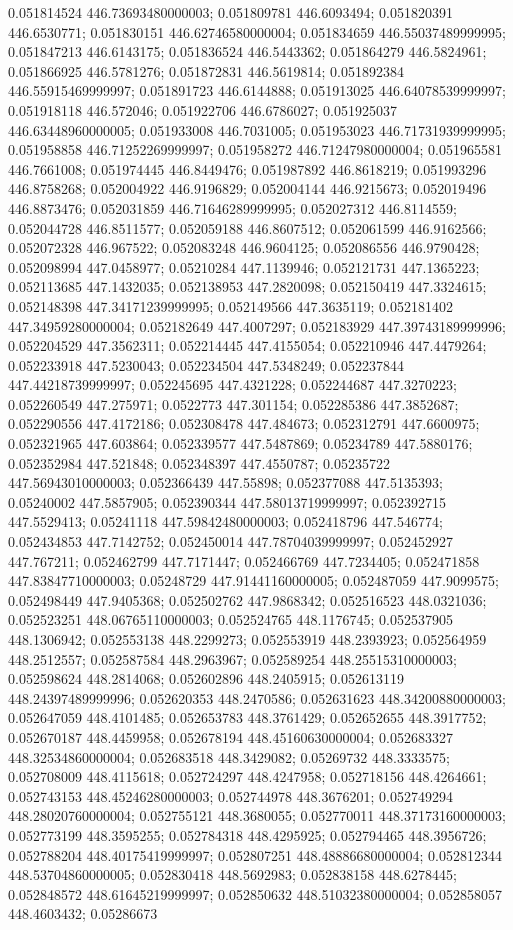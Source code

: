0.051814524 446.73693480000003; 0.051809781 446.6093494; 0.051820391 446.6530771; 0.051830151 446.62746580000004; 0.051834659 446.55037489999995; 0.051847213 446.6143175; 0.051836524 446.5443362; 0.051864279 446.5824961; 0.051866925 446.5781276; 0.051872831 446.5619814; 0.051892384 446.55915469999997; 0.051891723 446.6144888; 0.051913025 446.64078539999997; 0.051918118 446.572046; 0.051922706 446.6786027; 0.051925037 446.63448960000005; 0.051933008 446.7031005; 0.051953023 446.71731939999995; 0.051958858 446.71252269999997; 0.051958272 446.71247980000004; 0.051965581 446.7661008; 0.051974445 446.8449476; 0.051987892 446.8618219; 0.051993296 446.8758268; 0.052004922 446.9196829; 0.052004144 446.9215673; 0.052019496 446.8873476; 0.052031859 446.71646289999995; 0.052027312 446.8114559; 0.052044728 446.8511577; 0.052059188 446.8607512; 0.052061599 446.9162566; 0.052072328 446.967522; 0.052083248 446.9604125; 0.052086556 446.9790428; 0.052098994 447.0458977; 0.05210284 447.1139946; 0.052121731 447.1365223; 0.052113685 447.1432035; 0.052138953 447.2820098; 0.052150419 447.3324615; 0.052148398 447.34171239999995; 0.052149566 447.3635119; 0.052181402 447.34959280000004; 0.052182649 447.4007297; 0.052183929 447.39743189999996; 0.052204529 447.3562311; 0.052214445 447.4155054; 0.052210946 447.4479264; 0.052233918 447.5230043; 0.052234504 447.5348249; 0.052237844 447.44218739999997; 0.052245695 447.4321228; 0.052244687 447.3270223; 0.052260549 447.275971; 0.0522773 447.301154; 0.052285386 447.3852687; 0.052290556 447.4172186; 0.052308478 447.484673; 0.052312791 447.6600975; 0.052321965 447.603864; 0.052339577 447.5487869; 0.05234789 447.5880176; 0.052352984 447.521848; 0.052348397 447.4550787; 0.05235722 447.56943010000003; 0.052366439 447.55898; 0.052377088 447.5135393; 0.05240002 447.5857905; 0.052390344 447.58013719999997; 0.052392715 447.5529413; 0.05241118 447.59842480000003; 0.052418796 447.546774; 0.052434853 447.7142752; 0.052450014 447.78704039999997; 0.052452927 447.767211; 0.052462799 447.7171447; 0.052466769 447.7234405; 0.052471858 447.83847710000003; 0.05248729 447.91441160000005; 0.052487059 447.9099575; 0.052498449 447.9405368; 0.052502762 447.9868342; 0.052516523 448.0321036; 0.052523251 448.06765110000003; 0.052524765 448.1176745; 0.052537905 448.1306942; 0.052553138 448.2299273; 0.052553919 448.2393923; 0.052564959 448.2512557; 0.052587584 448.2963967; 0.052589254 448.25515310000003; 0.052598624 448.2814068; 0.052602896 448.2405915; 0.052613119 448.24397489999996; 0.052620353 448.2470586; 0.052631623 448.34200880000003; 0.052647059 448.4101485; 0.052653783 448.3761429; 0.052652655 448.3917752; 0.052670187 448.4459958; 0.052678194 448.45160630000004; 0.052683327 448.32534860000004; 0.052683518 448.3429082; 0.05269732 448.3333575; 0.052708009 448.4115618; 0.052724297 448.4247958; 0.052718156 448.4264661; 0.052743153 448.45246280000003; 0.052744978 448.3676201; 0.052749294 448.28020760000004; 0.052755121 448.3680055; 0.052770011 448.37173160000003; 0.052773199 448.3595255; 0.052784318 448.4295925; 0.052794465 448.3956726; 0.052788204 448.40175419999997; 0.052807251 448.48886680000004; 0.052812344 448.53704860000005; 0.052830418 448.5692983; 0.052838158 448.6278445; 0.052848572 448.61645219999997; 0.052850632 448.51032380000004; 0.052858057 448.4603432; 0.05286673 